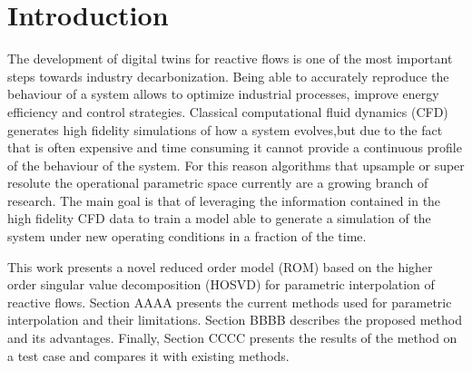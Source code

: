 \section{Introduction}

The development of digital twins for reactive flows is one of the most important steps towards industry decarbonization. Being able to accurately reproduce the behaviour of a system allows to optimize industrial processes, improve energy efficiency and control strategies. Classical computational fluid dynamics (CFD) generates high fidelity simulations of how a system evolves,but due to the fact that is often expensive and time consuming it cannot provide a continuous profile of the behaviour of the system. 
For this reason algorithms that upsample or super resolute the operational parametric space currently are a growing branch of research. The main goal is that of leveraging the information contained in the high fidelity CFD data to train a model able to generate a simulation of the system under new operating conditions in a fraction of the time. 

This work presents a novel reduced order model (ROM) based on the higher order singular value decomposition (HOSVD) for parametric interpolation of reactive flows. Section AAAA presents the current methods used for parametric interpolation and their limitations. Section BBBB describes the proposed method and its advantages. Finally, Section CCCC presents the results of the method on a test case and compares it with existing methods.

